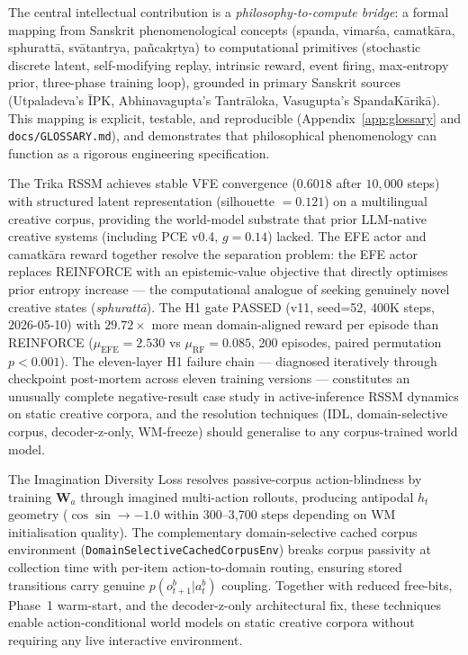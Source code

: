 \documentclass[journal,onecolumn,11pt]{IEEEtran}
\begin{document}
The central intellectual contribution is a \emph{philosophy-to-compute bridge}:
a formal mapping from Sanskrit phenomenological concepts (spanda, vimarśa,
camatkāra, sphurattā, svātantrya, pañcakṛtya) to computational primitives
(stochastic discrete latent, self-modifying replay, intrinsic reward, event firing,
max-entropy prior, three-phase training loop), grounded in primary Sanskrit sources
(Utpaladeva's ĪPK, Abhinavagupta's Tantrāloka, Vasugupta's SpandaKārikā).
This mapping is explicit, testable, and reproducible (Appendix~\ref{app:glossary}
and \texttt{docs/GLOSSARY.md}), and demonstrates that philosophical phenomenology
can function as a rigorous engineering specification.

The Trika RSSM achieves stable VFE convergence ($0.6018$ after $10{,}000$ steps)
with structured latent representation (silhouette $= 0.121$) on a multilingual
creative corpus, providing the world-model substrate that prior LLM-native creative
systems (including PCE v0.4, $g{=}0.14$) lacked.
The EFE actor and camatkāra reward together resolve the separation problem:
the EFE actor replaces REINFORCE with an epistemic-value objective that directly
optimises prior entropy increase — the computational analogue of seeking genuinely
novel creative states (\emph{sphurattā}).
The H1 gate PASSED (v11, seed=52, 400K steps, 2026-05-10) with
$29.72{\times}$ more mean domain-aligned reward per episode than REINFORCE
($\mu_{\text{EFE}}{=}2.530$ vs $\mu_{\text{RF}}{=}0.085$, 200 episodes, paired
permutation $p{<}0.001$).
The eleven-layer H1 failure chain --- diagnosed iteratively through checkpoint
post-mortem across eleven training versions — constitutes an unusually complete
negative-result case study in active-inference RSSM dynamics on static creative
corpora, and the resolution techniques (IDL, domain-selective corpus, decoder-z-only,
WM-freeze) should generalise to any corpus-trained world model.

The Imagination Diversity Loss resolves passive-corpus action-blindness by
training $\mathbf{W}_a$ through imagined multi-action rollouts, producing antipodal
$h_t$ geometry ($\cos\!\sin \to -1.0$ within 300--3{,}700 steps depending on WM
initialisation quality).
The complementary domain-selective cached corpus environment
(\texttt{Domain\-Selective\-Cached\-Corpus\-Env}) breaks corpus passivity
at collection time with per-item action-to-domain routing, ensuring stored transitions
carry genuine $p(o_{t+1}^b|a_t^b)$ coupling.
Together with reduced free-bits, Phase~1 warm-start, and the decoder-z-only
architectural fix, these techniques enable action-conditional world models on
static creative corpora without requiring any live interactive environment.
\end{document}
